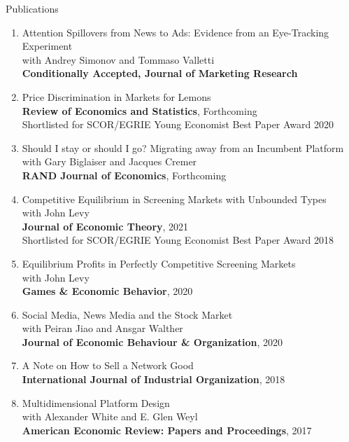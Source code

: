 \documentclass{resume}
\begin{document}
\begin{rSection}{Publications}

\begin{enumerate}

\item Attention Spillovers from News to Ads: Evidence from an Eye-Tracking Experiment \\
with Andrey Simonov and Tommaso Valletti\\
	\textbf{Conditionally Accepted, Journal of Marketing Research}

\item Price Discrimination in Markets for Lemons \\ 
\textbf{Review of Economics and Statistics}, Forthcoming \\
Shortlisted for SCOR/EGRIE Young Economist Best Paper Award 2020

\item Should I stay or should I go? Migrating away from an Incumbent Platform \\ 
with Gary Biglaiser and Jacques Cremer \\ 
\textbf{RAND Journal of Economics}, Forthcoming

\item Competitive Equilibrium in Screening Markets with Unbounded Types\\ 
with John Levy \\
\textbf{Journal of Economic Theory}, 2021
\\ Shortlisted for SCOR/EGRIE Young Economist Best Paper Award 2018

\item Equilibrium Profits in Perfectly Competitive Screening Markets\\
with John Levy \\
\textbf{Games \& Economic Behavior}, 2020

\item Social Media, News Media and the Stock Market\\ 
with Peiran Jiao and Ansgar Walther \\
\textbf{Journal of Economic Behaviour \& Organization}, 2020

\item A Note on How to Sell a Network Good \\
\textbf{International Journal of Industrial Organization}, 2018

\item Multidimensional Platform Design\\ 
with Alexander White and E. Glen Weyl \\
\textbf{American Economic Review: Papers and Proceedings}, 2017


\end{enumerate}
\end{rSection}
\end{document}
